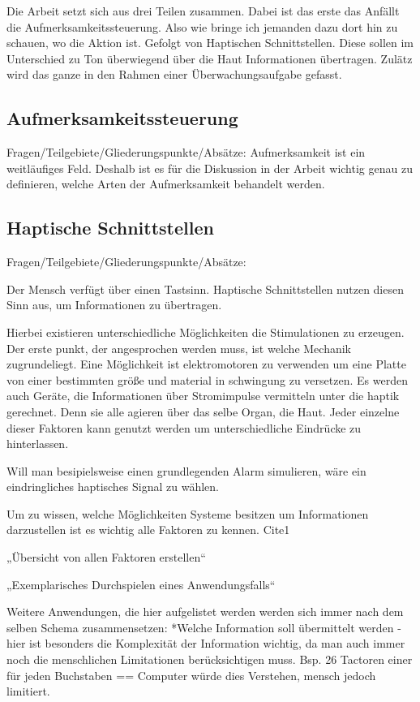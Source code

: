\documentclass{llncs}					%
\begin{document}
Die Arbeit setzt sich aus drei Teilen zusammen. Dabei ist das erste das Anfällt die Aufmerksamkeitssteuerung. Also wie bringe ich jemanden dazu dort hin zu schauen, wo die Aktion ist. Gefolgt von Haptischen Schnittstellen. Diese sollen im Unterschied zu Ton überwiegend über die Haut Informationen übertragen. Zulätz wird das ganze in den Rahmen einer Überwachungsaufgabe gefasst.

\subsection{Aufmerksamkeitssteuerung}
Fragen/Teilgebiete/Gliederungspunkte/Absätze:
Aufmerksamkeit ist ein weitläufiges Feld. Deshalb ist es für die Diskussion in der Arbeit wichtig genau zu definieren, welche Arten der Aufmerksamkeit behandelt werden.

\subsection{Haptische Schnittstellen}
Fragen/Teilgebiete/Gliederungspunkte/Absätze:

Der Mensch verfügt über einen Tastsinn. Haptische Schnittstellen nutzen diesen Sinn aus, um Informationen zu übertragen.

Hierbei existieren unterschiedliche Möglichkeiten die Stimulationen zu erzeugen.
Der erste punkt, der angesprochen werden muss, ist welche Mechanik zugrundeliegt. Eine Möglichkeit ist elektromotoren zu verwenden um eine Platte von einer bestimmten größe und material in schwingung zu versetzen. Es werden auch Geräte, die Informationen über Stromimpulse vermitteln unter die haptik gerechnet. Denn sie alle agieren über das selbe Organ, die Haut. Jeder einzelne dieser Faktoren kann genutzt werden um unterschiedliche Eindrücke zu hinterlassen.

Will man besipielsweise einen grundlegenden Alarm simulieren, wäre ein eindringliches haptisches Signal zu wählen.

Um zu wissen, welche Möglichkeiten Systeme besitzen um Informationen darzustellen ist es wichtig alle Faktoren zu kennen. Cite1

„Übersicht von allen Faktoren erstellen“

„Exemplarisches Durchspielen eines Anwendungsfalls“

Weitere Anwendungen, die hier aufgelistet werden werden sich immer nach dem selben Schema zusammensetzen:
*Welche Information soll übermittelt werden
-hier ist besonders die Komplexität der Information wichtig, da man auch immer noch die menschlichen Limitationen berücksichtigen muss.
Bsp. 26 Tactoren einer für jeden Buchstaben == Computer würde dies Verstehen, mensch jedoch limitiert.
\end{document}

